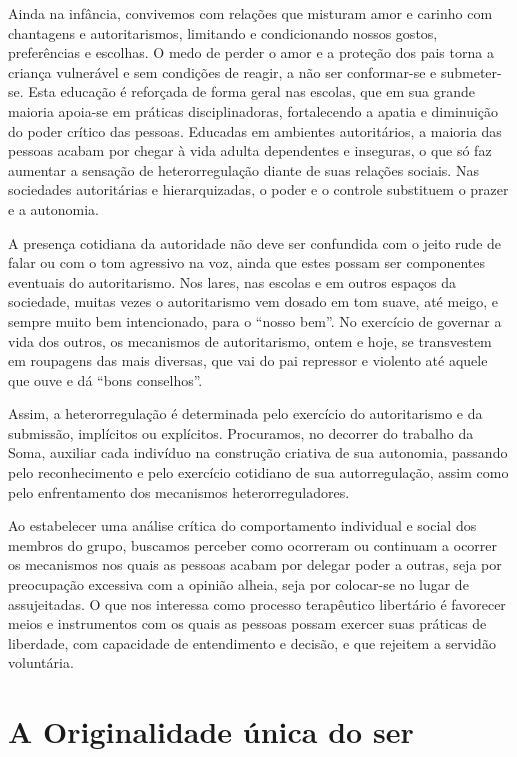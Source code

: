 Ainda na infância, convivemos com relações que misturam amor e carinho
com chantagens e autoritarismos, limitando e condicionando nossos
gostos, preferências e escolhas. O medo de perder o amor e a proteção
dos pais torna a criança vulnerável e sem condições de reagir, a não ser
conformar-se e submeter-se. Esta educação é reforçada de forma geral nas
escolas, que em sua grande maioria apoia-se em práticas disciplinadoras,
fortalecendo a apatia e diminuição do poder crítico das pessoas.
Educadas em ambientes autoritários, a maioria das pessoas acabam por
chegar à vida adulta dependentes e inseguras, o que só faz aumentar a
sensação de heterorregulação diante de suas relações sociais. Nas
sociedades autoritárias e hierarquizadas, o poder e o controle
substituem o prazer e a autonomia.

A presença cotidiana da autoridade não deve ser confundida com o jeito
rude de falar ou com o tom agressivo na voz, ainda que estes possam ser
componentes eventuais do autoritarismo. Nos lares, nas escolas e em
outros espaços da sociedade, muitas vezes o autoritarismo vem dosado em
tom suave, até meigo, e sempre muito bem intencionado, para o ``nosso
bem''. No exercício de governar a vida dos outros, os mecanismos de
autoritarismo, ontem e hoje, se transvestem em roupagens das mais
diversas, que vai do pai repressor e violento até aquele que ouve e dá
``bons conselhos''.

Assim, a heterorregulação é determinada pelo exercício do autoritarismo
e da submissão, implícitos ou explícitos. Procuramos, no decorrer do
trabalho da Soma, auxiliar cada indivíduo na construção criativa de sua
autonomia, passando pelo reconhecimento e pelo exercício cotidiano de
sua autorregulação, assim como pelo enfrentamento dos mecanismos
heterorreguladores.

Ao estabelecer uma análise crítica do comportamento individual e social
dos membros do grupo, buscamos perceber como ocorreram ou continuam a
ocorrer os mecanismos nos quais as pessoas acabam por delegar poder a
outras, seja por preocupação excessiva com a opinião alheia, seja por
colocar-se no lugar de assujeitadas. O que nos interessa como processo
terapêutico libertário é favorecer meios e instrumentos com os quais as
pessoas possam exercer suas práticas de liberdade, com capacidade de
entendimento e decisão, e que rejeitem a servidão voluntária.

\section{A Originalidade única do ser}

